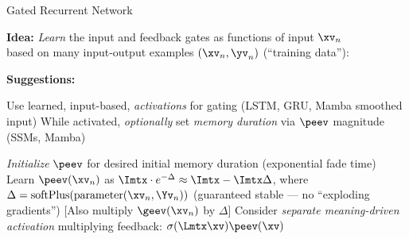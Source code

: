 \begin{slide}[\slideopts,toc={Gated RNN}]{Gated Recurrent Network}

\vspace{-1em}

  \textbf{Idea:} \emph{Learn} the input and feedback gates as functions of input $\xv_n$\\
  based on many input-output examples $(\xv_n,\yv_n)$ (``training data''):

\vspace{-1em}


\vspace{-1em}

\maybepause

\textbf{Suggestions:}
\begin{itemize}
\mpitem Use learned, input-based, \emph{activations} for gating (LSTM, GRU, Mamba smoothed input)
\mpitem While activated, \emph{optionally} set \emph{memory duration} via $\peev$ magnitude (SSMs, Mamba)
\begin{itemize}
  \mpitem \emph{Initialize} $\peev$ for desired initial memory duration (exponential fade time)
  \mpitem Learn $\peev(\xv_n)$ as $\Imtx\cdot e^{-\Delta}\approx \Imtx -\Imtx \Delta$,
  where $\Delta = \mbox{softPlus}(\mbox{parameter}(\xv_n,\Yv_n))$ (guaranteed stable --- no ``exploding gradients'')
  [Also multiply $\geev(\xv_n)$ by $\Delta$] %
  \mpitem Consider \emph{separate meaning-driven activation} multiplying feedback: $\sigma(\Lmtx\xv)\peev(\xv)$
\end{itemize}
\end{itemize}

\end{slide}

